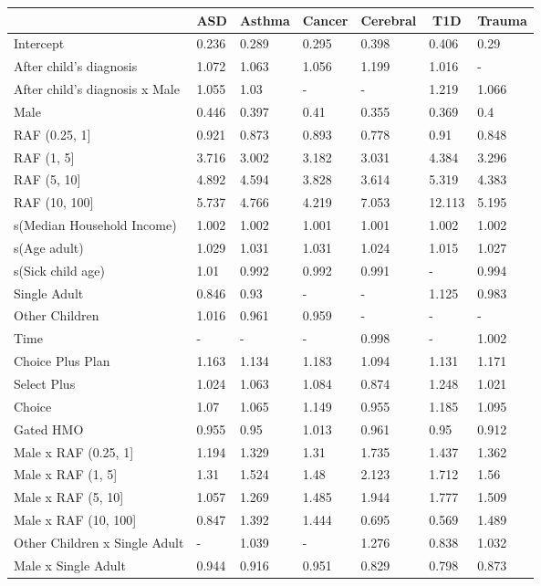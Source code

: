 \begin{table}[!tbp]
\begin{center}
\begin{tabular}{lllllll}
\hline\hline
\multicolumn{1}{l}{}&\multicolumn{1}{c}{ASD}&\multicolumn{1}{c}{Asthma}&\multicolumn{1}{c}{Cancer}&\multicolumn{1}{c}{Cerebral}&\multicolumn{1}{c}{T1D}&\multicolumn{1}{c}{Trauma}\tabularnewline
\hline
Intercept&0.236&0.289&0.295&0.398&0.406&0.29\tabularnewline
After child's diagnosis&1.072&1.063&1.056&1.199&1.016&-\tabularnewline
After child's diagnosis x Male&1.055&1.03&-&-&1.219&1.066\tabularnewline
Male&0.446&0.397&0.41&0.355&0.369&0.4\tabularnewline
RAF (0.25, 1]&0.921&0.873&0.893&0.778&0.91&0.848\tabularnewline
RAF (1, 5]&3.716&3.002&3.182&3.031&4.384&3.296\tabularnewline
RAF (5, 10]&4.892&4.594&3.828&3.614&5.319&4.383\tabularnewline
RAF (10, 100]&5.737&4.766&4.219&7.053&12.113&5.195\tabularnewline
s(Median Household Income)&1.002&1.002&1.001&1.001&1.002&1.002\tabularnewline
s(Age adult)&1.029&1.031&1.031&1.024&1.015&1.027\tabularnewline
s(Sick child age)&1.01&0.992&0.992&0.991&-&0.994\tabularnewline
Single Adult&0.846&0.93&-&-&1.125&0.983\tabularnewline
Other Children&1.016&0.961&0.959&-&-&-\tabularnewline
Time&-&-&-&0.998&-&1.002\tabularnewline
Choice Plus Plan&1.163&1.134&1.183&1.094&1.131&1.171\tabularnewline
Select Plus&1.024&1.063&1.084&0.874&1.248&1.021\tabularnewline
Choice&1.07&1.065&1.149&0.955&1.185&1.095\tabularnewline
Gated HMO&0.955&0.95&1.013&0.961&0.95&0.912\tabularnewline
Male x RAF (0.25, 1]&1.194&1.329&1.31&1.735&1.437&1.362\tabularnewline
Male x RAF (1, 5]&1.31&1.524&1.48&2.123&1.712&1.56\tabularnewline
Male x RAF (5, 10]&1.057&1.269&1.485&1.944&1.777&1.509\tabularnewline
Male x RAF (10, 100]&0.847&1.392&1.444&0.695&0.569&1.489\tabularnewline
Other Children x Single Adult&-&1.039&-&1.276&0.838&1.032\tabularnewline
Male x Single Adult&0.944&0.916&0.951&0.829&0.798&0.873\tabularnewline
\hline
\end{tabular}\end{center}
\end{table}
